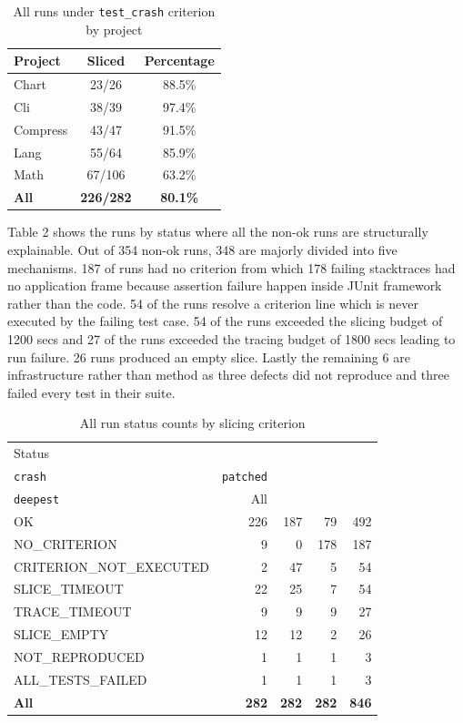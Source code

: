 \documentclass[sigconf,nonacm]{acmart}
\begin{document}
\begin{table}[htbp]
  \caption{All runs under \texttt{test\_crash} criterion by project}
  \label{tab:test_crash_runs}
  \begin{tabular}{lcc}
    \toprule
    Project & Sliced & Percentage \\
    \midrule
    Chart & 23/26 & 88.5\% \\
    Cli & 38/39 & 97.4\% \\
    Compress & 43/47 & 91.5\% \\
    Lang & 55/64 & 85.9\% \\
    Math & 67/106 & 63.2\% \\
    \midrule
    \textbf{All} & \textbf{226/282} & \textbf{80.1\%} \\
    \bottomrule
  \end{tabular}
\end{table}

Table 2 shows the runs by status where all the non-ok runs are structurally explainable. Out of 354 non-ok runs, 348 are majorly divided into five mechanisms. 187 of runs had no criterion from which 178 failing stacktraces had no application frame because assertion failure happen inside JUnit framework rather than the code. 54 of the runs resolve a criterion line which is never executed by the failing test case. 54 of the runs exceeded the slicing budget of 1200 secs and 27 of the runs exceeded the tracing budget of 1800 secs leading to run failure. 26 runs produced an empty slice. Lastly the remaining 6 are infrastructure rather than method as three defects did not reproduce and three failed every test in their suite. 

\begin{table}[htbp]
  \caption{All run status counts by slicing criterion}
  \label{tab:runs_by_status}
  \small
  \setlength{\tabcolsep}{3pt}
  \begin{tabular}{@{}lrrrr@{}}
    \toprule
    Status & \shortstack{\texttt{test\_}\\\texttt{crash}} & \texttt{patched} &
    \shortstack{\texttt{app\_}\\\texttt{deepest}} & All \\
    \midrule
    OK & 226 & 187 & 79 & 492 \\
    NO\_CRITERION & 9 & 0 & 178 & 187 \\
    CRITERION\_NOT\_EXECUTED & 2 & 47 & 5 & 54 \\
    SLICE\_TIMEOUT & 22 & 25 & 7 & 54 \\
    TRACE\_TIMEOUT & 9 & 9 & 9 & 27 \\
    SLICE\_EMPTY & 12 & 12 & 2 & 26 \\
    NOT\_REPRODUCED & 1 & 1 & 1 & 3 \\
    ALL\_TESTS\_FAILED & 1 & 1 & 1 & 3 \\
    \midrule
    \textbf{All} & \textbf{282} & \textbf{282} &
    \textbf{282} & \textbf{846} \\
    \bottomrule
  \end{tabular}
\end{table}
\end{document}
